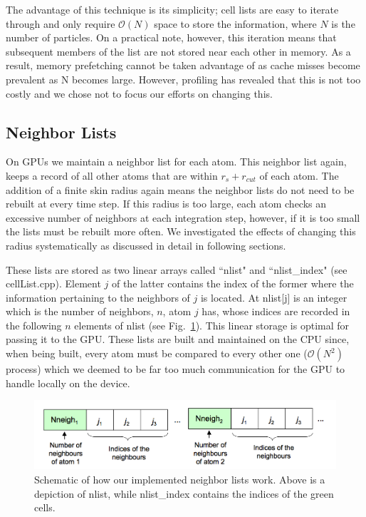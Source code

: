 \documentclass[12pt]{article}
\begin{document}
The advantage of this technique is its simplicity; cell lists are easy to iterate through and only require $\mathcal{O}(N)$ space to store the information, where $N$ is the number of particles.  On a practical note, however, this iteration means that subsequent members of the list are not stored near each other in memory.  As a result, memory prefetching cannot be taken advantage of as cache misses become prevalent as N becomes large.  However, profiling has revealed that this is not too costly and we chose not to focus our efforts on changing this.
\subsection{Neighbor Lists}
On GPUs we maintain a neighbor list for each atom.  This neighbor list again, keeps a record of all other atoms that are within $r_s + r_{cut}$ of each atom.  The addition of a finite skin radius again means the neighbor lists do not need to be rebuilt at every time step. If this radius is too large, each atom checks an excessive number of neighbors at each integration step, however, if it is too small the lists must be rebuilt more often.  We investigated the effects of changing this radius systematically as discussed in detail in following sections.  

These lists are stored as two linear arrays called ``nlist" and ``nlist\_index" (see cellList.cpp).  Element $j$ of the latter contains the index of the former where the information pertaining to the neighbors of $j$ is located.  At nlist[j] is an integer which is the number of neighbors, $n$, atom $j$ has, whose indices are recorded in the following $n$ elements of nlist (see Fig.~\ref{fig:nlist}).  This linear storage is optimal for passing it to the GPU.  These lists are built and maintained on the CPU since, when being built, every atom must be compared to every other one ($\mathcal{O}(N^2)$ process) which we deemed to be far too much communication for the GPU to handle locally on the device.

\begin{figure}[H]
   	\includegraphics[width=\textwidth]{nlist.png}
	\caption{Schematic of how our implemented neighbor lists work.  Above is a depiction of nlist, while nlist\_index contains the indices of the green cells.}
	\label{fig:nlist}
\end{figure}
\end{document}
